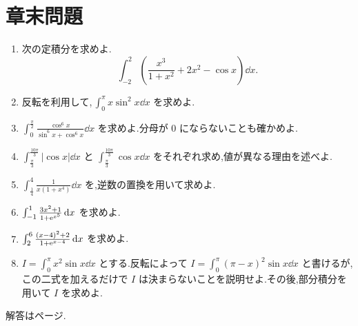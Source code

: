 \section*{章末問題}
\begin{enumerate}[label=\textbf{\thechapter.\arabic*},leftmargin=*]
\item\label{問:奇偶の混合}
次の定積分を求めよ.
\[
\int_{-2}^2\left(\frac{x^3}{1+x^2}+2x^2-\cos x\right)\dd x.
\]
\item\label{問:一次重み反転}
反転を利用して,\,$\int_0^\pi x\sin^2x\dd x$ を求めよ.
\item\label{問:三角相補}
$\int_0^{\frac{\pi}{2}}\frac{\cos^6x}{\sin^6x+\cos^6x}\dd x$ を求めよ.分母が $0$ にならないことも確かめよ.
\item\label{問:周期絶対値}
$\int_{\frac{\pi}{3}}^{\frac{10\pi}{3}}|\cos x|\dd x$ と
$\int_{\frac{\pi}{3}}^{\frac{10\pi}{3}}\cos x\dd x$ をそれぞれ求め,値が異なる理由を述べよ.
\item\label{問:逆数四乗}
$\int_{\frac14}^{4}\frac{1}{x(1+x^4)}\dd x$ を,逆数の置換を用いて求めよ.
\item\label{問:指数相補}
$\int_{-1}^1\frac{3x^2+1}{1+\mathrm{e}^{x^5}}\,\mathrm{d} x$ を求めよ.
\item\label{問:中心を移す相補}
$\int_2^6\frac{(x-4)^2+2}{1+\mathrm{e}^{x-4}}\,\mathrm{d} x$ を求めよ.
\item\label{問:二次重みの限界}
$I=\int_0^\pi x^2\sin x\dd x$ とする.反転によって
$I=\int_0^\pi(\pi-x)^2\sin x\dd x$ と書けるが,この二式を加えるだけで $I$ は決まらないことを説明せよ.その後,部分積分を用いて $I$ を求めよ.
\end{enumerate}

\smallskip\noindent 解答は\pageref{解答:第8章}ページ.

